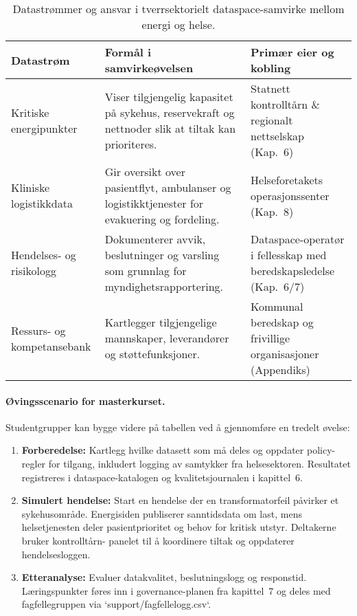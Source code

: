 \begin{table}[ht]
    \centering
    \caption{Datastrømmer og ansvar i tverrsektorielt dataspace-samvirke mellom energi og helse.}
    \label{tab:kap03-tversektor-samvirke}
    \begin{tabular}{p{}p{}p{}}
        \toprule
        \textbf{Datastrøm} & \textbf{Formål i samvirkeøvelsen} & \textbf{Primær eier og kobling} \\
        \midrule
        Kritiske energipunkter & Viser tilgjengelig kapasitet på sykehus, reservekraft og nettnoder slik at tiltak kan prioriteres. & Statnett kontrolltårn \& regionalt nettselskap (Kap.~6) \\
        Kliniske logistikkdata & Gir oversikt over pasientflyt, ambulanser og logistikktjenester for evakuering og fordeling. & Helseforetakets operasjonssenter (Kap.~8) \\
        Hendelses- og risikologg & Dokumenterer avvik, beslutninger og varsling som grunnlag for myndighetsrapportering. & Dataspace-operatør i fellesskap med beredskapsledelse (Kap.~6/7) \\
        Ressurs- og kompetansebank & Kartlegger tilgjengelige mannskaper, leverandører og støttefunksjoner. & Kommunal beredskap og frivillige organisasjoner (Appendiks) \\
        \bottomrule
    \end{tabular}
\end{table}

\paragraph{Øvingsscenario for masterkurset.} Studentgrupper kan bygge videre på tabellen ved å gjennomføre en tredelt øvelse:
\begin{enumerate}
    \item \textbf{Forberedelse:} Kartlegg hvilke datasett som må deles og oppdater policy-regler for tilgang, inkludert logging av
    samtykker fra helsesektoren. Resultatet registreres i dataspace-katalogen og kvalitetsjournalen i kapittel~6.
    \item \textbf{Simulert hendelse:} Start en hendelse der en transformatorfeil påvirker et sykehusområde. Energisiden publiserer
    sanntidsdata om last, mens helsetjenesten deler pasientprioritet og behov for kritisk utstyr. Deltakerne bruker kontrolltårn-
    panelet til å koordinere tiltak og oppdaterer hendelsesloggen.
    \item \textbf{Etteranalyse:} Evaluer datakvalitet, beslutningslogg og responstid. Læringspunkter føres inn i governance-planen
    fra kapittel~7 og deles med fagfellegruppen via `support/fagfellelogg.csv`.
\end{enumerate}

